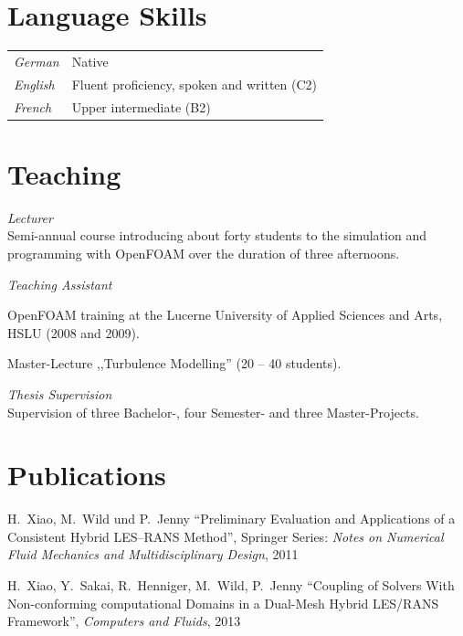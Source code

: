 \documentclass[line,11pt,a4paper]{../resume}
\begin{document}
\begin{resume}
\section{\mysidestyle Language Skills}\vspace{2mm}
\begin{tabular}{@{}ll}
  \textsl{German}   & Native \\
  \textsl{English}  & Fluent proficiency, spoken and written (C2) \\
  \textsl{French}  & Upper intermediate (B2) \\
\end{tabular}

\section{\mysidestyle Teaching}\vspace{2mm}

\textsl{Lecturer}\\
Semi-annual course introducing about forty students to the simulation and
programming with OpenFOAM over the duration of three afternoons.

\textsl{Teaching Assistant}
\begin{list2}
\item OpenFOAM training at the Lucerne University of Applied Sciences and Arts, HSLU
(2008 and 2009).
\item Master-Lecture ,,Turbulence Modelling'' (20 -- 40 students).
\end{list2}

\textsl{Thesis Supervision}\\
Supervision of three Bachelor-, four Semester- and three Master-Projects.

\section{\mysidestyle Publications}\vspace{2mm}
H.~Xiao, M.~Wild und P.~Jenny ``Preliminary Evaluation and
Applications of a Consistent Hybrid LES--RANS Method'', Springer Series:
\textsl{Notes on Numerical Fluid Mechanics and Multidisciplinary Design}, 2011

\vspace{-2mm}
H.~Xiao, Y.~Sakai, R.~Henniger, M.~Wild, P.~Jenny
``Coupling of Solvers With Non-conforming computational Domains in a Dual-Mesh
Hybrid LES/RANS Framework'', \textsl{Computers and Fluids}, 2013


\end{resume}
\end{document}
